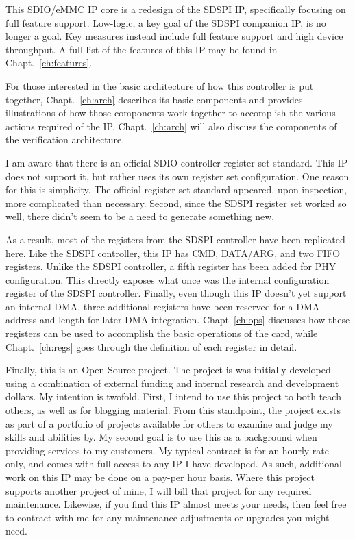 \documentclass{gqtekspec}
\begin{document}
This SDIO/eMMC IP core is a redesign of the SDSPI IP, specifically focusing on
full feature support.  Low-logic, a key goal of the SDSPI companion IP, is no
longer a goal.  Key measures instead include full feature support and high
device throughput.  A full list of the features of this IP may be found in
Chapt.~\ref{ch:features}.

For those interested in the basic architecture of how this controller is put
together, Chapt.~\ref{ch:arch} describes its basic components and provides
illustrations of how those components work together to accomplish the various
actions required of the IP.  Chapt.~\ref{ch:arch} will also discuss the
components of the verification architecture.

I am aware that there is an official SDIO controller register set standard.
This IP does not support it, but rather uses its own register set configuration.
One reason for this is simplicity.  The official register set standard
appeared, upon inspection, more complicated than necessary.  Second, since
the SDSPI register set worked so well, there didn't seem to be a need to
generate something new.

As a result, most of the registers from the SDSPI controller have been
replicated here.
Like the SDSPI controller, this IP has CMD, DATA/ARG, and two FIFO registers.
Unlike the SDSPI controller, a fifth register has been added for PHY
configuration.  This directly exposes what once was the internal configuration
register of the SDSPI controller.  Finally, even though this IP doesn't yet
support an internal DMA, three additional registers have been reserved for a
DMA address and length for later DMA integration.  Chapt~\ref{ch:ops} discusses
how these registers can be used to accomplish the basic operations of the card,
while Chapt.~\ref{ch:regs} goes through the definition of each register in
detail.

Finally, this is an Open Source project.  The project is was initially
developed using a combination of external funding and internal research and
development dollars.  My intention is twofold.  First, I intend to use this
project to both teach others, as well as for blogging material.  From this
standpoint, the project exists as part of a portfolio of projects available for
others to examine and judge my skills and abilities by.  My second goal is to
use this as a background when providing services to my customers.  My typical
contract is for an hourly rate only, and comes with full access to any IP I
have developed.  As such, additional work on this IP may be done on a pay-per
hour basis.  Where this project supports another project of mine, I will bill
that project for any required maintenance.  Likewise, if you find this IP
almost meets your needs, then feel free to contract with me for any
maintenance adjustments or upgrades you might need.
\end{document}
